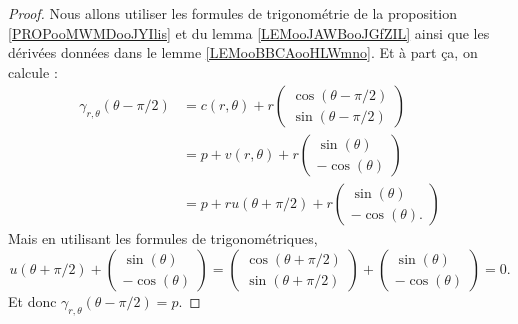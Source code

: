 \begin{proof}
	Nous allons utiliser les formules de trigonométrie de la proposition \ref{PROPooMWMDooJYIlis} et du lemma \ref{LEMooJAWBooJGfZIL} ainsi que les dérivées données dans le lemme \ref{LEMooBBCAooHLWmno}. Et à part ça, on calcule :
	\begin{subequations}
		\begin{align}
			\gamma_{r,\theta}(\theta-\pi/2) & =c(r,\theta)+r\begin{pmatrix}
				                                                \cos(\theta-\pi/2) \\
				                                                \sin(\theta-\pi/2)
			                                                \end{pmatrix}    \\
			                                & =p+v(r,\theta)+r\begin{pmatrix}
				                                                  \sin(\theta) \\
				                                                  -\cos(\theta)
			                                                  \end{pmatrix}      \\
			                                & =p+ru(\theta+\pi/2)+r\begin{pmatrix}
				                                                       \sin(\theta) \\
				                                                       -\cos(\theta).
			                                                       \end{pmatrix}
		\end{align}
	\end{subequations}
	Mais en utilisant les formules de trigonométriques,
	\begin{equation}
		u(\theta+\pi/2)+\begin{pmatrix}
			\sin(\theta) \\
			-\cos(\theta)
		\end{pmatrix}=\begin{pmatrix}
			\cos(\theta+\pi/2) \\
			\sin(\theta+\pi/2)
		\end{pmatrix}+\begin{pmatrix}
			\sin(\theta) \\
			-\cos(\theta)
		\end{pmatrix}=0.
	\end{equation}
	Et donc \( \gamma_{r,\theta}(\theta-\pi/2)=p\).


\end{proof}
